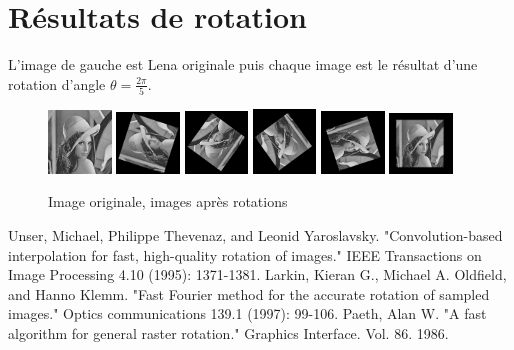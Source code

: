 \documentclass[12pt]{article}
\begin{document}
\section*{Résultats de rotation}
L'image de gauche est Lena originale puis chaque image est le résultat d'une rotation d'angle $\theta = \frac{2\pi}{5}$.

\begin{figure}[h]
	\includegraphics[width=0.15\textwidth]{lena.png}
	\includegraphics[width=0.15\textwidth]{rotation_2pi_1.png}
	\includegraphics[width=0.15\textwidth]{rotation_2pi_2.png}
	\includegraphics[width=0.15\textwidth]{rotation_2pi_3.png}
	\includegraphics[width=0.15\textwidth]{rotation_2pi_4.png}
	\includegraphics[width=0.15\textwidth]{rotation_2pi_5.png}
  \caption{Image originale, images après rotations}
\end{figure}


\newpage
\begin{thebibliography}{2}

  Unser, Michael, Philippe Thevenaz, and Leonid Yaroslavsky. 
  "Convolution-based interpolation for fast, high-quality rotation of images." 
  IEEE Transactions on Image Processing 4.10 (1995): 1371-1381.
  Larkin, Kieran G., Michael A. Oldfield, and Hanno Klemm. 
  "Fast Fourier method for the accurate rotation of sampled images." 
  Optics communications 139.1 (1997): 99-106.
	Paeth, Alan W. 
	"A fast algorithm for general raster rotation." 
	Graphics Interface. Vol. 86. 1986.

\end{thebibliography}
\end{document}
